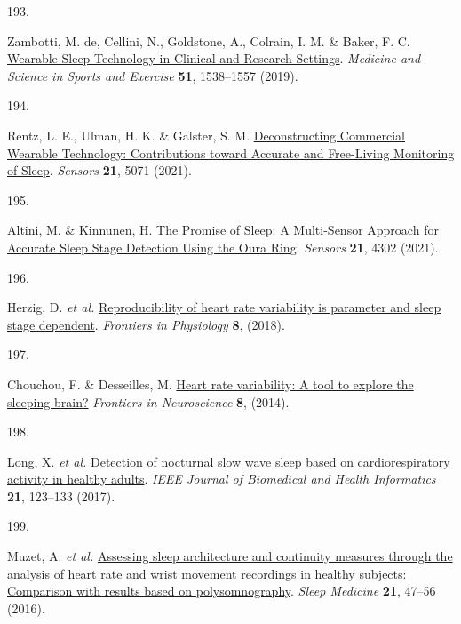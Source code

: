 \documentclass[
  10pt,
]{scrbook}
\newlength{\cslhangindent}
\newlength{\csllabelwidth}
\newlength{\cslentryspacingunit} %
\newenvironment{CSLReferences}[2] %
 {%
  \setlength{\parindent}{0pt}
  \ifodd #1
  \let\oldpar\par
  \def\par{\hangindent=\cslhangindent\oldpar}
  \fi
  \setlength{\parskip}{#2\cslentryspacingunit}
 }%
 {}
\newcommand{\CSLLeftMargin}[1]{\parbox[t]{\csllabelwidth}{#1}}
\newcommand{\CSLRightInline}[1]{\parbox[t]{\linewidth - \csllabelwidth}{#1}\break}
\let\originaltextbf\textbf
\renewcommand{\textbf}[1]{\textcolor{color1}{\textsf{\originaltextbf{#1}}}}
\begin{document}
\begin{CSLReferences}{0}{0}
\leavevmode{}%
\CSLLeftMargin{193. }%
\CSLRightInline{Zambotti, M. de, Cellini, N., Goldstone, A., Colrain, I.
M. \& Baker, F. C.
\href{https://doi.org/10.1249/MSS.0000000000001947}{Wearable Sleep
Technology in Clinical and Research Settings}. \emph{Medicine and
Science in Sports and Exercise} \textbf{51}, 1538--1557 (2019).}

\leavevmode{}%
\CSLLeftMargin{194. }%
\CSLRightInline{Rentz, L. E., Ulman, H. K. \& Galster, S. M.
\href{https://doi.org/10.3390/s21155071}{Deconstructing Commercial
Wearable Technology: Contributions toward Accurate and Free-Living
Monitoring of Sleep}. \emph{Sensors} \textbf{21}, 5071 (2021).}

\leavevmode{}%
\CSLLeftMargin{195. }%
\CSLRightInline{Altini, M. \& Kinnunen, H.
\href{https://doi.org/10.3390/s21134302}{The Promise of Sleep: A
Multi-Sensor Approach for Accurate Sleep Stage Detection Using the Oura
Ring}. \emph{Sensors} \textbf{21}, 4302 (2021).}

\leavevmode{}%
\CSLLeftMargin{196. }%
\CSLRightInline{Herzig, D. \emph{et al.}
\href{https://www.frontiersin.org/articles/10.3389/fphys.2017.01100}{Reproducibility
of heart rate variability is parameter and sleep stage dependent}.
\emph{Frontiers in Physiology} \textbf{8}, (2018).}

\leavevmode{}%
\CSLLeftMargin{197. }%
\CSLRightInline{Chouchou, F. \& Desseilles, M.
\href{https://www.frontiersin.org/articles/10.3389/fnins.2014.00402}{Heart
rate variability: A tool to explore the sleeping brain?} \emph{Frontiers
in Neuroscience} \textbf{8}, (2014).}

\leavevmode{}%
\CSLLeftMargin{198. }%
\CSLRightInline{Long, X. \emph{et al.}
\href{https://doi.org/10.1109/JBHI.2015.2487446}{Detection of nocturnal
slow wave sleep based on cardiorespiratory activity in healthy adults}.
\emph{IEEE Journal of Biomedical and Health Informatics} \textbf{21},
123--133 (2017).}

\leavevmode{}%
\CSLLeftMargin{199. }%
\CSLRightInline{Muzet, A. \emph{et al.}
\href{https://doi.org/10.1016/j.sleep.2016.01.015}{Assessing sleep
architecture and continuity measures through the analysis of heart rate
and wrist movement recordings in healthy subjects: Comparison with
results based on polysomnography}. \emph{Sleep Medicine} \textbf{21},
47--56 (2016).}

\end{CSLReferences}
\end{document}
